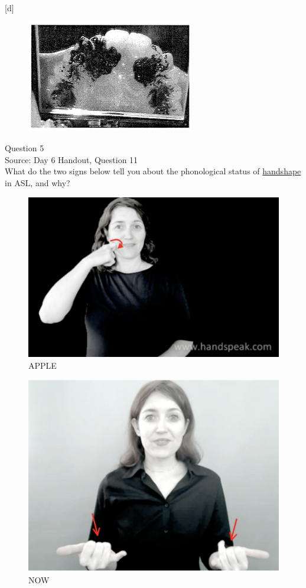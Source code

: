 \documentclass[12pt]{article}
\begin{document}
{[d]}

\begin{figure}[H]
\includegraphics{../images/staticpalatography_fricative.png}
\end{figure}

\newpage

{\large Question 5}\\

Source: Day 6 Handout, Question 11\\

What do the two signs below tell you about the phonological status of \underline{handshape} in ASL, and why?\\

\begin{figure}[H]
\includegraphics{../images/asl_apple.png}
\caption{APPLE}
\end{figure}
\begin{figure}[H]
\includegraphics{../images/asl_now.png}
\caption{NOW}
\end{figure}
\end{document}
